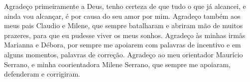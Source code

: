 \begin{agradecimentos}

Agradeço primeiramente a Deus, tenho certeza de que tudo o que já alcancei, e ainda vou alcançar, é por causa do seu amor por mim. Agradeço também aos meus pais Claudio e Milene, que sempre batalharam e abriram mão de muitos prazeres, para que eu pudesse viver os meus sonhos. Agradeço às minhas irmãs Marianna e Débora, por sempre me apoiarem com palavras de incentivo e em alguns momentos, palavras de correção. Agradeço ao meu orientador Maurício Serrano, e minha coorientadora Milene Serrano, que sempre me apoiaram, defenderam e corrigiram. 

\end{agradecimentos}
